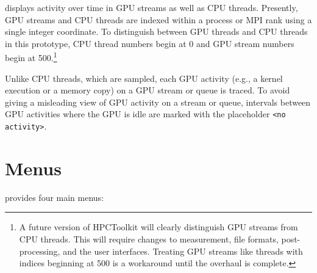 \hpctraceviewer{} displays activity over time in GPU streams as well as CPU threads. Presently, GPU streams and CPU threads are indexed within a process or MPI rank using a single integer coordinate. To distinguish between GPU threads and CPU threads in this prototype, CPU thread numbers begin at 0 and GPU stream numbers begin at 500.\footnote{A future version of HPCToolkit will clearly distinguish GPU streams from CPU threads. This will require changes to measurement, file formats, post-processing, and the user interfaces. Treating GPU streams like threads with indices beginning at 500 is a workaround until the overhaul is complete.}

Unlike CPU threads, which are sampled, each GPU activity (e.g., a kernel execution or a memory copy)  on a GPU stream or queue is traced. To avoid giving a misleading view of GPU activity on a stream or queue, intervals between GPU activities where the GPU is idle are marked with the placeholder \verb|<no activity>|.




\section{Menus}

\hpcviewer{} provides four main menus:


